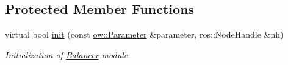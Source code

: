\subsection*{Protected Member Functions}
\begin{DoxyCompactItemize}
\item 
virtual bool \hyperlink{classow__balancer_1_1Balancer_ab864c91d85ec802e833efcbabe41dec7}{init} (const \hyperlink{classow_1_1Parameter}{ow\+::\+Parameter} \&parameter, ros\+::\+Node\+Handle \&nh)\hypertarget{classow__balancer_1_1Balancer_ab864c91d85ec802e833efcbabe41dec7}{}\label{classow__balancer_1_1Balancer_ab864c91d85ec802e833efcbabe41dec7}

\begin{DoxyCompactList}\small\item\em Initialization of \hyperlink{classow__balancer_1_1Balancer}{Balancer} module. \end{DoxyCompactList}\end{DoxyCompactItemize}
